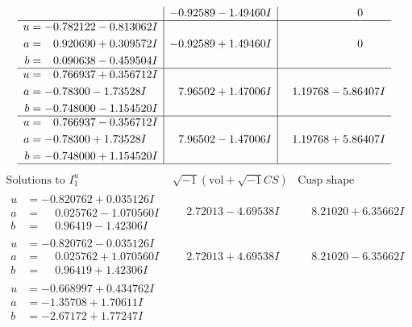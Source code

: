 \documentclass[1p]{elsarticle_modified}
\theoremstyle{definition}
\newcommand{\I}{\sqrt{-1}}
\begin{document}
$$\begin{array}{c|c|c}
 & -0.92589 - 1.49460 I & \phantom{-0.000000 } 0 \\ \hline\begin{aligned}
u &= -0.782122 - 0.813062 I \\
a &= \phantom{-}0.920690 + 0.309572 I \\
b &= \phantom{-}0.090638 - 0.459504 I\end{aligned}
 & -0.92589 + 1.49460 I & \phantom{-0.000000 } 0 \\ \hline\begin{aligned}
u &= \phantom{-}0.766937 + 0.356712 I \\
a &= -0.78300 - 1.73528 I \\
b &= -0.748000 - 1.154520 I\end{aligned}
 & \phantom{-}7.96502 + 1.47006 I & \phantom{-}1.19768 - 5.86407 I \\ \hline\begin{aligned}
u &= \phantom{-}0.766937 - 0.356712 I \\
a &= -0.78300 + 1.73528 I \\
b &= -0.748000 + 1.154520 I\end{aligned}
 & \phantom{-}7.96502 - 1.47006 I & \phantom{-}1.19768 + 5.86407 I\\
 \hline 
 \end{array}$$\newpage$$\begin{array}{c|c|c}  
\text{Solutions to }I^u_{1}& \I (\text{vol} + \sqrt{-1}CS) & \text{Cusp shape}\\
 \hline 
\begin{aligned}
u &= -0.820762 + 0.035126 I \\
a &= \phantom{-}0.025762 - 1.070560 I \\
b &= \phantom{-}0.96419 - 1.42306 I\end{aligned}
 & \phantom{-}2.72013 - 4.69538 I & \phantom{-}8.21020 + 6.35662 I \\ \hline\begin{aligned}
u &= -0.820762 - 0.035126 I \\
a &= \phantom{-}0.025762 + 1.070560 I \\
b &= \phantom{-}0.96419 + 1.42306 I\end{aligned}
 & \phantom{-}2.72013 + 4.69538 I & \phantom{-}8.21020 - 6.35662 I \\ \hline\begin{aligned}
u &= -0.668997 + 0.434762 I \\
a &= -1.35708 + 1.70611 I \\
b &= -2.67172 + 1.77247 I\end{aligned}

\end{array}$$
\end{document}
